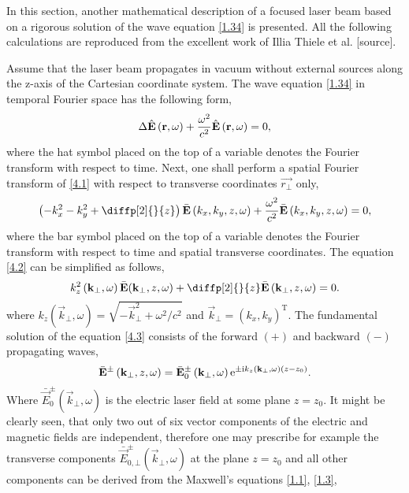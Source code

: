 In this section, another mathematical description of a focused laser beam based on a rigorous solution of the wave equation \ref{1.34} is presented. All the following calculations are reproduced from the excellent work of Illia Thiele et al. [source]. 

Assume that the laser beam propagates in vacuum without external sources along the z-axis of the Cartesian coordinate system. The wave equation \ref{1.34} in temporal Fourier space has the following form,
\begin{equation}
\label{4.1}
\Delta \hat{\mathbf{E}} \left(\mathbf{r}, \omega \right) + \frac{\omega^2}{c^2} \hat{\mathbf{E}} \left(\mathbf{r}, \omega \right) = 0,
\end{equation}
where the hat symbol placed on the top of a variable denotes the Fourier transform with respect to time. Next, one shall perform a spatial Fourier transform of \ref{4.1} with respect to transverse coordinates $ \vec{r_\bot} $ only,
\begin{equation}
\label{4.2}
\left(- k^2_x - k^2_y + \diffp[2]{}{z} \right) \bar{\vec{E}} \left(k_x, k_y, z, \omega \right) + \frac{\omega^2}{c^2} \bar{\vec{E}} \left(k_x, k_y, z, \omega \right) = 0,
\end{equation}
where the bar symbol placed on the top of a variable denotes the Fourier transform with respect to time and spatial transverse coordinates. The equation \ref{4.2} can be simplified as follows,
\begin{equation}
\label{4.3}
k^2_z \left(\vec{k}_\bot, \omega \right) \bar{\vec{E}}(\vec{k}_\bot, z, \omega) + \diffp[2]{}{z} \bar{\vec{E}} \left(\vec{k}_\bot, z, \omega \right) = 0.
\end{equation}
where $ k_z \left(\vec{k}_\bot, \omega \right) = \sqrt{-\vec{k}_\bot^2 + \omega^2/c^2} $ and $ \vec{k}_\bot = (k_x, k_y)^{\mathrm{T}} $. The fundamental solution of the equation \ref{4.3} consists of the forward $ (+) $ and backward $ (-) $ propagating waves,
\begin{equation}
\label{4.4}
\bar{\mathbf{E}}^{\pm} \left(\mathbf{k}_\bot, z, \omega \right) = \bar{\mathbf{E}}_{0}^{\pm} \left(\mathbf{k}_\bot, \omega \right) \mathrm{e}^{\pm \mathrm{i} k_z \left(\mathbf{k}_\bot, \omega \right) \left(z - z_0 \right)}.
\end{equation}
Where $ \bar{\vec{E}}_{0}^{\pm}\left(\vec{k}_\bot, \omega \right) $ is the electric laser field at some plane $ z = z_0 $. It might be clearly seen, that only two out of six vector components of the electric and magnetic fields are independent, therefore one may prescribe for example the transverse components $ \bar{\vec{E}}_{0, \bot}^{\pm}\left(\vec{k}_\bot, \omega \right) $ at the plane $ z = z_0 $ and all other components can be derived from the Maxwell's equations \ref{1.1}, \ref{1.3},
